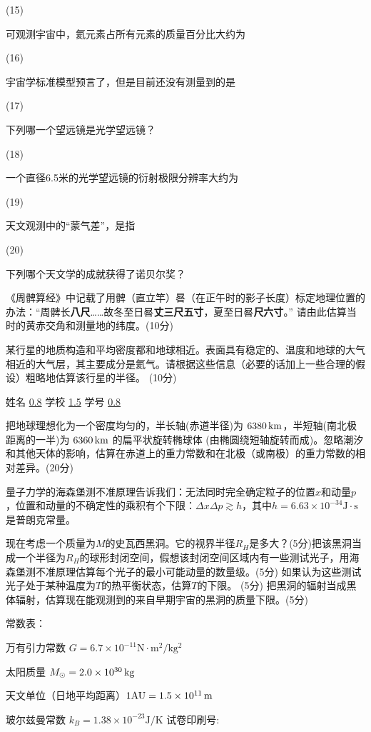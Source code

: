 \documentclass[CJK]{article}
\begin{document}
\item[(15)]{可观测宇宙中，氦元素占所有元素的质量百分比大约为

}
\item[(16)]{宇宙学标准模型预言了，但是目前还没有测量到的是

}  
\item[(17)]{下列哪一个望远镜是光学望远镜？

}  
\item[(18)]{一个直径6.5米的光学望远镜的衍射极限分辨率大约为

}      
\item[(19)]{天文观测中的“蒙气差”，是指

}
\item[(20)]{下列哪个天文学的成就获得了诺贝尔奖？
  
}
  
\eitem

{
《周髀算经》中记载了用髀（直立竿）晷（在正午时的影子长度）标定地理位置的办法：“周髀长{\bf 八尺}……故冬至日晷{\bf 丈三尺五寸}，夏至日晷{\bf 尺六寸}。”
 请由此估算当时的黄赤交角和测量地的纬度。{\blue (10分)}

{\vskip 4in}

某行星的地质构造和平均密度都和地球相近。表面具有稳定的、温度和地球的大气相近的大气层，其主要成分是氦气。请根据这些信息（必要的话加上一些合理的假设）粗略地估算该行星的半径。 {\blue (10分)}

\newpage
}
姓名 \uline{0.8} {\hskip 0.2in}  学校 \uline{1.5}{\hskip 0.2in} 学号 \uline{0.8}{\hskip 0.2in}

{
把地球理想化为一个密度均匀的，半长轴(赤道半径)为 $6380\,\mathrm{km}$，半短轴(南北极距离的一半)为 $6360\,\mathrm{km}$ 的扁平状旋转椭球体 (由椭圆绕短轴旋转而成)。忽略潮汐和其他天体的影响，估算在赤道上的重力常数和在北极（或南极）的重力常数的相对差异。{\blue (20分)}
\newpage
}
{
量子力学的海森堡测不准原理告诉我们：无法同时完全确定粒子的位置$x$和动量$p$，位置和动量的不确定性的乘积有个下限：$\Delta x \Delta p \gtrsim h$，其中$h=6.63\times 10^{-34}\mathrm{J\cdot s}$是普朗克常量。

现在考虑一个质量为$M$的史瓦西黑洞。它的视界半径$R_H$是多大？{\blue (5分)}把该黑洞当成一个半径为$R_H$的球形封闭空间，假想该封闭空间区域内有一些测试光子，用海森堡测不准原理估算每个光子的最小可能动量的数量级。{\blue (5分)} 如果认为这些测试光子处于某种温度为$T$的热平衡状态，估算$T$的下限。 {\blue (5分)} 把黑洞的辐射当成黑体辐射，估算现在能观测到的来自早期宇宙的黑洞的质量下限。{\blue (5分)}

{\vskip 7.8in}
}


常数表：

万有引力常数 $G = 6.7\times 10^{-11}\mathrm{N\cdot m^2/kg^2}$

太阳质量 $M_\odot = 2.0\times 10^{30}\,\mathrm{kg}$

天文单位（日地平均距离）$1\mathrm{AU} = 1.5\times 10^{11}\,\mathrm{m}$

玻尔兹曼常数 $k_B=1.38\times 10^{-23}\mathrm{J/K}$
\bcenter
    {\scriptsize 试卷印刷号: \version}
\ecenter
\ech
\end{document}
